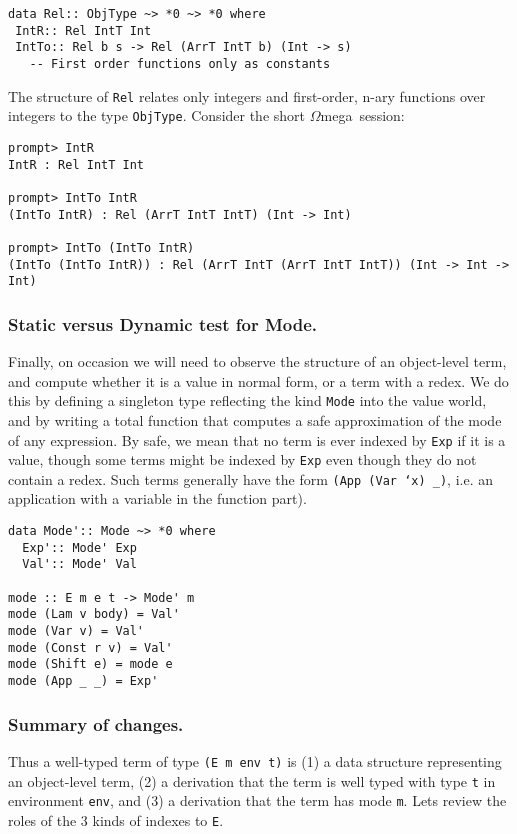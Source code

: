 \documentclass[11pt,twoside,A4]{llncs}
\newcommand{\om}{\emph{$\Omega$}mega}
\begin{document}
{\small
\begin{verbatim}
data Rel:: ObjType ~> *0 ~> *0 where
 IntR:: Rel IntT Int
 IntTo:: Rel b s -> Rel (ArrT IntT b) (Int -> s)
   -- First order functions only as constants
\end{verbatim}}
The structure of {\tt Rel} relates only integers and first-order, n-ary
functions over integers to the type {\tt ObjType}. Consider the short \om\ session:

{\small
\begin{verbatim}
prompt> IntR
IntR : Rel IntT Int

prompt> IntTo IntR
(IntTo IntR) : Rel (ArrT IntT IntT) (Int -> Int)

prompt> IntTo (IntTo IntR)
(IntTo (IntTo IntR)) : Rel (ArrT IntT (ArrT IntT IntT)) (Int -> Int -> Int)
\end{verbatim}}

\subsubsection{Static versus Dynamic test for Mode.}

Finally, on occasion we will need to observe the structure of
an object-level term, and compute whether it is a value in normal
form, or a term with a redex. We do this by defining a singleton type
reflecting the kind {\tt Mode} into the value world,
and by writing a total function that computes 
a safe approximation of the mode of any expression. By safe, we mean that no
term is ever indexed by {\tt Exp} if it is a value, though some terms
might be indexed by {\tt Exp} even though they do not contain a redex.
Such terms generally have the form {\tt (App (Var `x) \_)}, i.e. an
application with a variable in the function part).

{\small
\begin{verbatim}
data Mode':: Mode ~> *0 where
  Exp':: Mode' Exp
  Val':: Mode' Val

mode :: E m e t -> Mode' m
mode (Lam v body) = Val'
mode (Var v) = Val'
mode (Const r v) = Val'
mode (Shift e) = mode e
mode (App _ _) = Exp'
\end{verbatim}}

\subsubsection{Summary of changes.}
Thus
a well-typed term of type {\tt (E m env t)} is 
(1) a data structure representing an object-level
term, (2) a derivation that the term is well typed with type {\tt t}
in environment {\tt env}, 
and (3) a derivation that the term has mode {\tt m}. 
Lets review the roles of the 3 kinds of indexes to {\tt E}.
\end{document}
